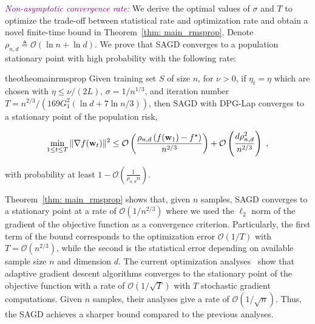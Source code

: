 \documentclass[11pt]{article}
\begin{document}
\textcolor{purple}{\textit{Non-asymptotic convergence rate:}}
We derive the optimal values of $\sigma$ and $T$ to optimize the trade-off between statistical rate and optimization rate and obtain a novel finite-time bound in Theorem~\ref{thm: main_rmsprop}. 
Denote $\rho_{n,d} \triangleq\mathcal{O} \left(\ln n + \ln d\right)$.
We prove that \textsc{SAGD} converges to a population stationary point with high probability with the following rate:
\begin{restatable}{theo}{theomainrmsprop}
\label{thm: main_rmsprop}
 Given training set $S$ of size $n$, for $\nu >0$, if $\eta_t = \eta$ which are chosen with $\eta \leq \nu/(2L)$,  $\sigma = 1/n^{1/3}$, and iteration number $T = n^{2/3}/\left(169G_1^2(\ln d +7\ln n/3)\right)$, then \textsc{SAGD} with DPG-Lap converges to a stationary point of the population risk, \ie 
 \begin{small}
\begin{equation*}
 \min_{1\leq t \leq T}\|\nabla f(\mathbf{w}_t)\|^2 \leq
\mathcal{O} \left( \frac{\rho_{n,d} \left(f(\mathbf{w}_1) - f^\star \right)}{n^{2/3}} \right) + \mathcal{O} \left( \frac{d \rho_{n,d}^2}{n^{2/3}}\right)~,
\end{equation*}
\end{small}
with probability at least $1-\mathcal{O}\left(\frac{1}{\rho_{n,d} n}\right)$.
\end{restatable} 
Theorem~\ref{thm: main_rmsprop} shows that, given $n$ samples, \textsc{SAGD} converges to a stationary point at a rate of $\mathcal{O}(1/n^{2/3})$ where we used the $\ell_2$ norm of the gradient of the objective function as a convergence criterion.
Particularly, the first term of the bound corresponds to the optimization error $\mathcal{O}(1/T)$ with $T = \mathcal{O}(n^{2/3})$, while the second is the statistical error depending on available sample size $n$ and dimension $d$. 
The current optimization analyses~\citep{zare18, wawu19, zosh2019, cheli2019} show that adaptive gradient descent algorithms converges to the stationary point of the objective function with a rate of $\mathcal{O}(1/\sqrt{T})$ with $T$ stochastic gradient computations. 
Given $n$ samples, their analyses give a rate of  $\mathcal{O}(1/\sqrt{n})$. 
Thus, the \textsc{SAGD} achieves a sharper bound compared to the previous analyses.  
\vspace{-0.05in}
\end{document}
